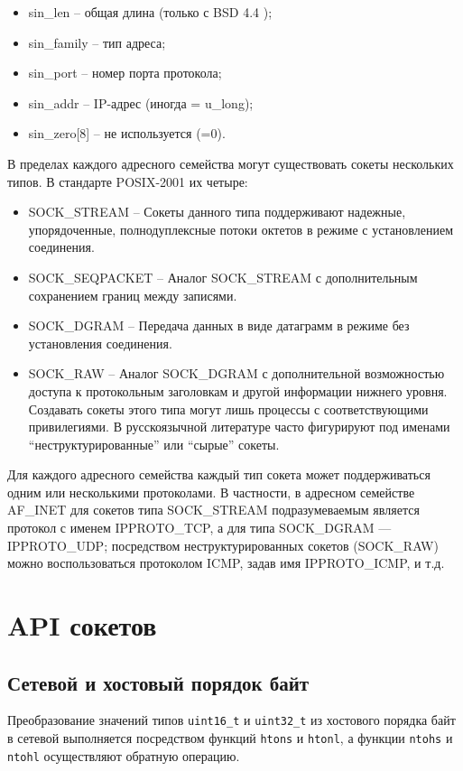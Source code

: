 \begin{itemize}
	\item sin\_len -- общая длина (только с BSD 4.4 );
	\item sin\_family -- тип адреса;
	\item sin\_port -- номер порта протокола;
	\item sin\_addr -- IP-адрес (иногда = u\_long);
	\item sin\_zero[8] -- не используется (=0).
\end{itemize}

В пределах каждого адресного семейства могут существовать сокеты нескольких типов. В стандарте POSIX-2001 их четыре:
\begin{itemize}
	\item SOCK\_STREAM -- Сокеты данного типа поддерживают надежные, упорядоченные, полнодуплексные потоки октетов в режиме с установлением соединения. 
	\item SOCK\_SEQPACKET -- Аналог SOCK\_STREAM с дополнительным сохранением границ между записями. 
	\item SOCK\_DGRAM -- Передача данных в виде датаграмм в режиме без установления соединения. 
	\item SOCK\_RAW -- Аналог SOCK\_DGRAM с дополнительной возможностью доступа к протокольным заголовкам и другой информации нижнего уровня. Создавать сокеты этого типа могут лишь процессы с соответствующими привилегиями. В русскоязычной литературе часто фигурируют под именами ``неструктурированные'' или ``сырые'' сокеты.
\end{itemize}

Для каждого адресного семейства каждый тип сокета может поддерживаться одним или несколькими протоколами. В частности, в адресном семействе AF\_INET для сокетов типа SOCK\_STREAM подразумеваемым является протокол с именем IPPROTO\_TCP, а для типа SOCK\_DGRAM --- IPPROTO\_UDP; посредством неструктурированных сокетов (SOCK\_RAW) можно воспользоваться протоколом ICMP, задав имя IPPROTO\_ICMP, и т.д. 

\section{API сокетов}
\subsection{Сетевой и хостовый порядок байт}

Преобразование значений типов {\tt uint16\_t} и {\tt uint32\_t} из хостового порядка 
байт в сетевой выполняется посредством функций {\tt htons} и {\tt htonl},
а функции {\tt ntohs} и {\tt ntohl} осуществляют обратную операцию.

